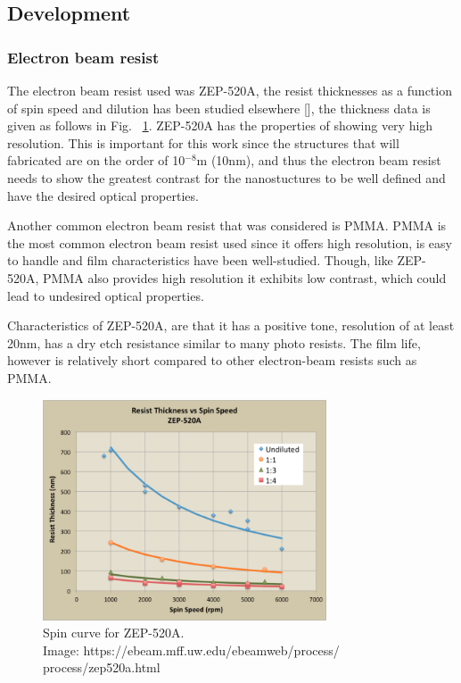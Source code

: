 \subsection{Development}
\subsubsection{Electron beam resist}
The electron beam resist used was ZEP-520A, the resist thicknesses as a function of spin speed and dilution has been studied elsewhere [\cite{SpinCurve}], the thickness data is given as follows in Fig. ~\ref{spinCurve}. ZEP-520A has the properties of showing very high resolution. This is important for this work since the structures that will fabricated are on the order of 10$^{-8}$m (10nm), and thus the electron beam resist needs to show the greatest contrast for the nanostuctures to be well defined and have the desired optical properties. 

Another common electron beam resist that was considered is PMMA. PMMA is the most common electron beam resist used since it offers high resolution, is easy to handle and film characteristics have been well-studied. Though, like ZEP-520A, PMMA also provides high resolution it exhibits low contrast, which could lead to undesired optical properties.

Characteristics of ZEP-520A, are that it has a positive tone, resolution of at least 20nm, has a dry etch resistance similar to many photo resists. The film life, however is relatively short compared to other electron-beam resists such as PMMA.
\begin{figure}[h!]
\centering
\includegraphics[width=0.75\textwidth]{ZEP520a_spincurve.png}
\caption{Spin curve for ZEP-520A. \\Image: https://ebeam.mff.uw.edu/ebeamweb/process/ process/zep520a.html}
\label{spinCurve}
\end{figure}
